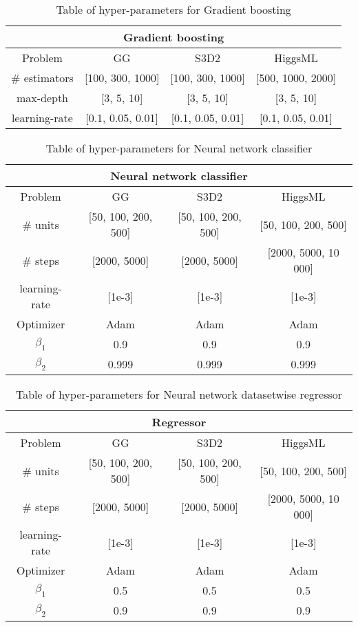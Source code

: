

\begin{table}[h!]
\centering
\begin{tabular}{||c c c c||} 
 \hline
 \multicolumn{4}{|c|}{Gradient boosting}\\
 \hline
 Problem & GG & S3D2 & HiggsML \\ [0.5ex] 
 \hline
 \# estimators & [100, 300, 1000] & [100, 300, 1000] & [500, 1000, 2000] \\ 
 max-depth     & [3, 5, 10] & [3, 5, 10] & [3, 5, 10] \\
 learning-rate & [0.1, 0.05, 0.01] & [0.1, 0.05, 0.01] & [0.1, 0.05, 0.01] \\
 \hline
\end{tabular}
\caption{Table of hyper-parameters for Gradient boosting}
\label{table:HP_GB}
\end{table}


\begin{table}[h!]
\centering
\begin{tabular}{||c c c c||} 
 \hline
 \multicolumn{4}{|c|}{Neural network classifier}\\
 \hline
 Problem & GG & S3D2 & HiggsML \\ [0.5ex] 
 \hline
 \# units & [50, 100, 200, 500] & [50, 100, 200, 500] & [50, 100, 200, 500] \\ 
 \# steps & [2000, 5000] & [2000, 5000] & [2000, 5000, 10 000] \\
 learning-rate & [1e-3] & [1e-3] & [1e-3] \\
 Optimizer & Adam & Adam & Adam \\
 $\beta_1$ & 0.9 & 0.9 & 0.9 \\
 $\beta_2$ & 0.999 & 0.999 & 0.999 \\
 \hline
\end{tabular}
\caption{Table of hyper-parameters for Neural network classifier}
\label{table:HP_NN}
\end{table}



\begin{table}[h!]
\centering
\begin{tabular}{||c c c c||} 
 \hline
 \multicolumn{4}{|c|}{Regressor}\\
 \hline
 Problem & GG & S3D2 & HiggsML \\ [0.5ex] 
 \hline
 \# units & [50, 100, 200, 500] & [50, 100, 200, 500] & [50, 100, 200, 500] \\ 
 \# steps & [2000, 5000] & [2000, 5000] & [2000, 5000, 10 000] \\
 learning-rate & [1e-3] & [1e-3] & [1e-3] \\
 Optimizer & Adam & Adam & Adam \\
 $\beta_1$ & 0.5 & 0.5 & 0.5 \\
 $\beta_2$ & 0.9 & 0.9 & 0.9 \\
 \hline
\end{tabular}
\caption{Table of hyper-parameters for Neural network datasetwise regressor}
\label{table:HP_REG}
\end{table}






